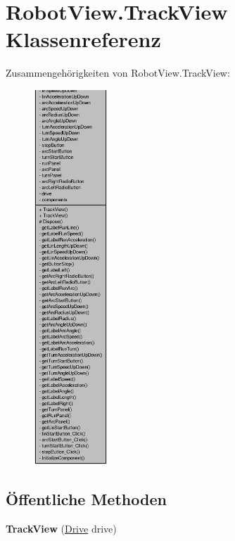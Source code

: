 \hypertarget{class_robot_view_1_1_track_view}{
\section{RobotView.TrackView Klassenreferenz}
\label{class_robot_view_1_1_track_view}
}


Zusammengehörigkeiten von RobotView.TrackView:\nopagebreak
\begin{figure}[H]
\begin{center}
\leavevmode
\includegraphics[height=400pt]{class_robot_view_1_1_track_view__coll__graph}
\end{center}
\end{figure}
\subsection*{Öffentliche Methoden}
\begin{DoxyCompactItemize}
\item 
\hypertarget{class_robot_view_1_1_track_view_a0c2477f2b24b1a5b1015c5b4711a56fa}{
{\bfseries TrackView} (\hyperlink{class_robot_ctrl_1_1_drive}{Drive} drive)}
\label{class_robot_view_1_1_track_view_a0c2477f2b24b1a5b1015c5b4711a56fa}

\end{DoxyCompactItemize}

